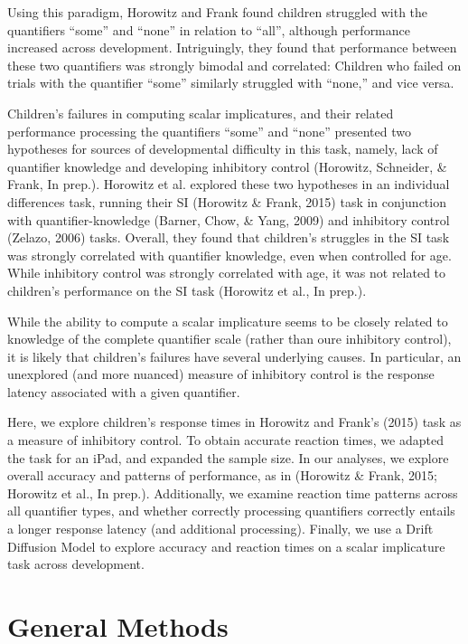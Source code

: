 \documentclass[10pt, letterpaper]{article}
\begin{document}
Using this paradigm, Horowitz and Frank found children struggled with
the quantifiers ``some'' and ``none'' in relation to ``all'', although
performance increased across development. Intriguingly, they found that
performance between these two quantifiers was strongly bimodal and
correlated: Children who failed on trials with the quantifier ``some''
similarly struggled with ``none,'' and vice versa.

Children's failures in computing scalar implicatures, and their related
performance processing the quantifiers ``some'' and ``none'' presented
two hypotheses for sources of developmental difficulty in this task,
namely, lack of quantifier knowledge and developing inhibitory control
(Horowitz, Schneider, \& Frank, In prep.). Horowitz et al. explored
these two hypotheses in an individual differences task, running their SI
(Horowitz \& Frank, 2015) task in conjunction with quantifier-knowledge
(Barner, Chow, \& Yang, 2009) and inhibitory control (Zelazo, 2006)
tasks. Overall, they found that children's struggles in the SI task was
strongly correlated with quantifier knowledge, even when controlled for
age. While inhibitory control was strongly correlated with age, it was
not related to children's performance on the SI task (Horowitz et al.,
In prep.).

While the ability to compute a scalar implicature seems to be closely
related to knowledge of the complete quantifier scale (rather than oure
inhibitory control), it is likely that children's failures have several
underlying causes. In particular, an unexplored (and more nuanced)
measure of inhibitory control is the response latency associated with a
given quantifier.

Here, we explore children's response times in Horowitz and Frank's
(2015) task as a measure of inhibitory control. To obtain accurate
reaction times, we adapted the task for an iPad, and expanded the sample
size. In our analyses, we explore overall accuracy and patterns of
performance, as in (Horowitz \& Frank, 2015; Horowitz et al., In prep.).
Additionally, we examine reaction time patterns across all quantifier
types, and whether correctly processing quantifiers correctly entails a
longer response latency (and additional processing). Finally, we use a
Drift Diffusion Model to explore accuracy and reaction times on a scalar
implicature task across development.

\section{General Methods}\label{general-methods}
\end{document}
